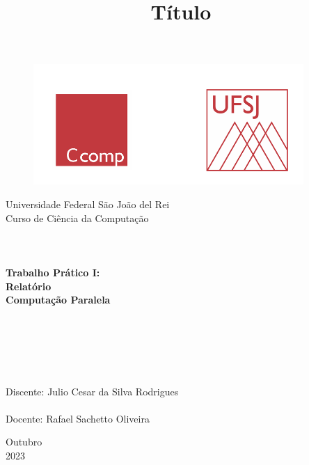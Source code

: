 \documentclass[a4paper, 12pt]{article}
\begin{document}

\begin{titlepage}
	\begin{center}
	
	\begin{figure}[ht]
    \centering
    \includegraphics[width=.44\textwidth]{Images/LogoUFSJ.PNG}
    \label{fig:Capturar.PNG}
    \end{figure}

    	\Huge{Universidade Federal São João del Rei}\\
		\Large{Curso de Ciência da Computação}\\ 

        \vspace{90pt}
        \textbf{\LARGE{
        \\
        \\
        \\
        Trabalho Prático I:\\
        Relatório\\
        \vspace{0.5cm}
        \Large{Computação Paralela}
        \\
        \\
        \\
        }}
        
		\title{{\large{Título}}}
		\vspace{1.5cm}
	\end{center}
	    
    \begin{flushleft}
		\begin{tabbing}
		\\
		\\
		\\	
		\large{Discente: Julio Cesar da Silva Rodrigues}\\
	    \\
		\large{Docente: Rafael Sachetto Oliveira}\\
	    \end{tabbing}
    \end{flushleft}
	\vspace{1cm}
	
	\begin{center}
		\vspace{\fill}
			Outubro\\
		    2023
	\end{center}
\end{titlepage}
\end{document}
